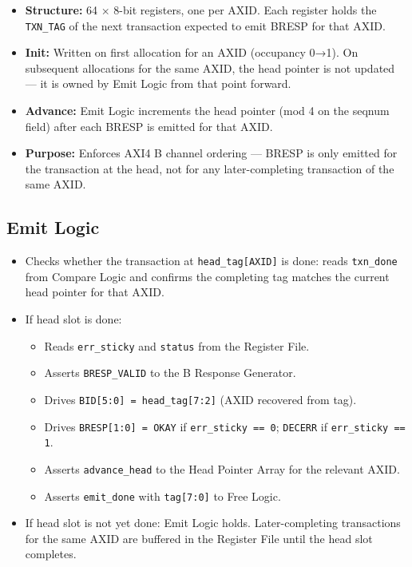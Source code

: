 \begin{itemize}
  \item \textbf{Structure:} 64 × 8-bit registers, one per AXID.
        Each register holds the \texttt{TXN\_TAG} of the next
        transaction expected to emit BRESP for that AXID.
  \item \textbf{Init:} Written on first allocation for an AXID
        (occupancy 0→1). On subsequent allocations for the same AXID,
        the head pointer is not updated — it is owned by Emit Logic
        from that point forward.
  \item \textbf{Advance:} Emit Logic increments the head pointer
        (mod 4 on the seqnum field) after each BRESP is emitted for
        that AXID.
  \item \textbf{Purpose:} Enforces AXI4 B channel ordering — BRESP
        is only emitted for the transaction at the head, not for
        any later-completing transaction of the same AXID.
\end{itemize}

\subsection{Emit Logic}

\begin{itemize}
  \item Checks whether the transaction at \texttt{head\_tag[AXID]} is
        done: reads \texttt{txn\_done} from Compare Logic and confirms
        the completing tag matches the current head pointer for that
        AXID.
  \item If head slot is done:
  \begin{itemize}
    \item Reads \texttt{err\_sticky} and \texttt{status} from the
          Register File.
    \item Asserts \texttt{BRESP\_VALID} to the B Response Generator.
    \item Drives \texttt{BID[5:0] = head\_tag[7:2]} (AXID recovered
          from tag).
    \item Drives \texttt{BRESP[1:0] = OKAY} if \texttt{err\_sticky
          == 0}; \texttt{DECERR} if \texttt{err\_sticky == 1}.
    \item Asserts \texttt{advance\_head} to the Head Pointer Array
          for the relevant AXID.
    \item Asserts \texttt{emit\_done} with \texttt{tag[7:0]} to Free
          Logic.
  \end{itemize}
  \item If head slot is not yet done: Emit Logic holds. Later-completing
        transactions for the same AXID are buffered in the Register File
        until the head slot completes.
\end{itemize}

